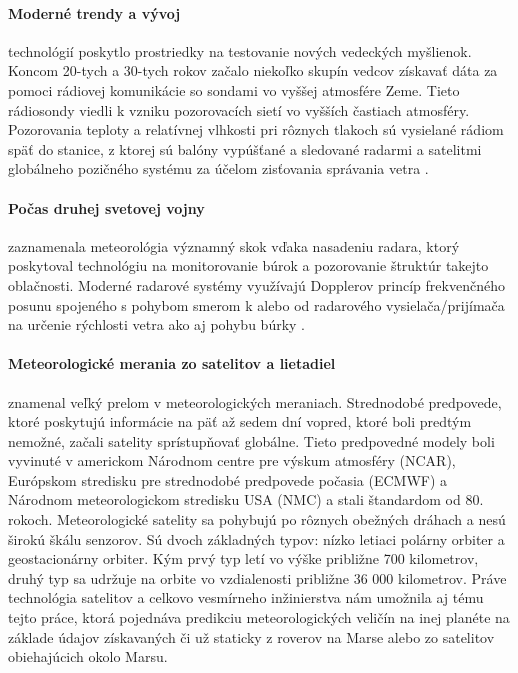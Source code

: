 \paragraph{Moderné trendy a vývoj} technológií poskytlo prostriedky na testovanie nových vedeckých myšlienok. Koncom 20-tych a 30-tych rokov začalo niekoľko skupín vedcov získavať dáta za pomoci rádiovej komunikácie so sondami vo vyššej atmosfére Zeme. Tieto rádiosondy viedli k vzniku pozorovacích sietí vo vyšších častiach atmosféry. Pozorovania teploty a relatívnej vlhkosti pri rôznych tlakoch sú vysielané rádiom späť do stanice, z ktorej sú balóny vypúšťané a sledované radarmi a satelitmi globálneho pozičného systému za účelom zisťovania správania vetra \cite{meteo}.

\paragraph{Počas druhej svetovej vojny} zaznamenala meteorológia významný skok vďaka nasadeniu radara, ktorý poskytoval technológiu na monitorovanie búrok a pozorovanie štruktúr takejto oblačnosti. Moderné radarové systémy využívajú Dopplerov princíp frekvenčného posunu spojeného s pohybom smerom k alebo od radarového vysielača/prijímača na určenie rýchlosti vetra ako aj pohybu búrky \cite{meteo}.

\paragraph{Meteorologické merania zo satelitov a lietadiel} znamenal veľký prelom v meteorologických meraniach. Strednodobé predpovede, ktoré poskytujú informácie na päť až sedem dní vopred, ktoré boli predtým nemožné, začali satelity sprístupňovať globálne. Tieto predpovedné modely boli vyvinuté v americkom Národnom centre pre výskum atmosféry (NCAR), Európskom stredisku pre strednodobé predpovede počasia (ECMWF) a Národnom meteorologickom stredisku USA (NMC) a stali štandardom od 80. rokoch. Meteorologické satelity sa pohybujú po rôznych obežných dráhach a nesú širokú škálu senzorov. Sú dvoch základných typov: nízko letiaci polárny orbiter a geostacionárny orbiter. Kým prvý typ letí vo výške približne 700 kilometrov, druhý typ sa udržuje na orbite vo vzdialenosti približne 36 000 kilometrov. Práve technológia satelitov a celkovo vesmírneho inžinierstva nám umožnila aj tému tejto práce, ktorá pojednáva predikciu meteorologických veličín na inej planéte na základe údajov získavaných či už staticky z roverov na Marse alebo zo satelitov obiehajúcich okolo Marsu.

